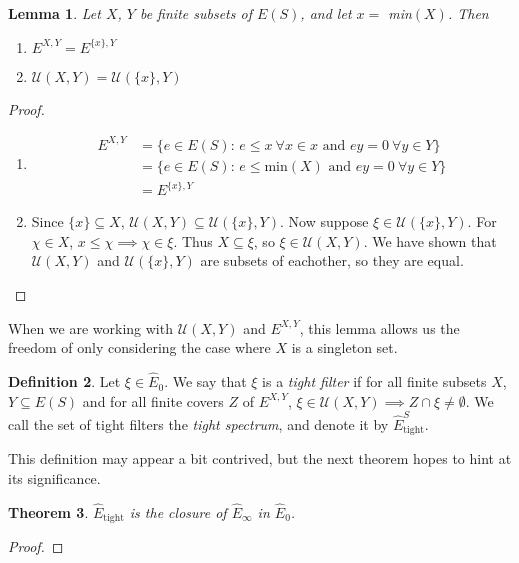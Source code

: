 \documentclass{article}
\newtheorem{theorem}{Theorem}[section]
\newtheorem{lemma}[theorem]{Lemma}
\theoremstyle{definition}
\newtheorem{definition}[theorem]{Definition}
\begin{document}
\begin{lemma} Let $X$, $Y$ be finite subsets of $E(S)$, and let $x =$ min$(X)$. Then
    \begin{enumerate}
        \item[(i)] $E^{X, Y} = E^{\{x\}, Y}$
        \item[(ii)] $\mathcal{U}(X, Y) = \mathcal{U}(\{x\}, Y)$
    \end{enumerate}
\end{lemma}
\begin{proof}
    \begin{enumerate}
        \item[(i)] 
            \begin{align*}
                E^{X, Y} &= \{ e \in E(S)\text{: } e \leq x \ \forall x \in x \text{ and } ey = 0 \ \forall y \in Y \} \\
                         &= \{ e \in E(S)\text{: } e \leq \text{min}(X) \text{ and } ey = 0 \ \forall y \in Y \} \\
                         &= E^{\{x\}, Y}
            \end{align*}
        \item[(ii)]
            Since $\{x\} \subseteq X$, $\mathcal{U}(X, Y) \subseteq \mathcal{U}(\{x\}, Y)$. Now suppose $\xi \in \mathcal{U}(\{x\}, Y)$.
            For $\chi \in X$, $x \leq \chi \implies \chi \in \xi$. Thus $X \subseteq \xi$, so $\xi \in \mathcal{U}(X, Y)$. We have
            shown that $\mathcal{U}(X, Y)$ and $\mathcal{U}(\{x\}, Y)$ are subsets of eachother, so they are equal.
    \end{enumerate}
\end{proof}
When we are working with $\mathcal{U}(X, Y)$ and $E^{X, Y}$, this lemma allows us the freedom of only considering the case
where $X$ is a singleton set.

\begin{definition} 
    Let $\xi \in \hat{E}_0$. We say that $\xi$ is a \textit{tight filter} if for all finite subsets $X$, $Y \subseteq E(S)$
    and for all finite covers $Z$ of $E^{X, Y}$, $\xi \in \mathcal{U}(X, Y) \implies Z \cap \xi \neq \emptyset$. We call
    the set of tight filters the \textit{tight spectrum}, and denote it by $\hat{E}_{\text{tight}}^S$.
\end{definition}
This definition may appear a bit contrived, but the next theorem hopes to hint at its significance.

\begin{theorem} $\hat{E}_{\text{tight}}$ is the closure of $\hat{E}_\infty$ in $\hat{E}_0$. \end{theorem}
\begin{proof}
\end{proof}
\end{document}
